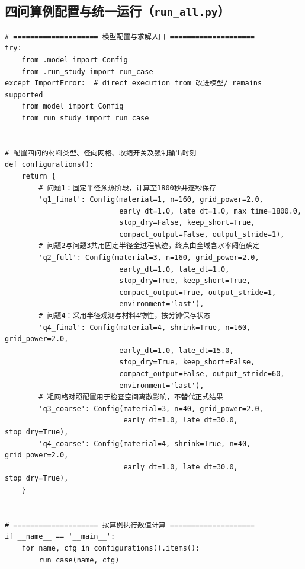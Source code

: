 \subsection{四问算例配置与统一运行（\texttt{run\_all.py}）}
\begin{Verbatim}[fontsize=\scriptsize,breaklines=true,breakanywhere=true]
# ==================== 模型配置与求解入口 ====================
try:
    from .model import Config
    from .run_study import run_case
except ImportError:  # direct execution from 改进模型/ remains supported
    from model import Config
    from run_study import run_case


# 配置四问的材料类型、径向网格、收缩开关及强制输出时刻
def configurations():
    return {
        # 问题1：固定半径预热阶段，计算至1800秒并逐秒保存
        'q1_final': Config(material=1, n=160, grid_power=2.0,
                           early_dt=1.0, late_dt=1.0, max_time=1800.0,
                           stop_dry=False, keep_short=True,
                           compact_output=False, output_stride=1),
        # 问题2与问题3共用固定半径全过程轨迹，终点由全域含水率阈值确定
        'q2_full': Config(material=3, n=160, grid_power=2.0,
                           early_dt=1.0, late_dt=1.0,
                           stop_dry=True, keep_short=True,
                           compact_output=True, output_stride=1,
                           environment='last'),
        # 问题4：采用半径观测与材料4物性，按分钟保存状态
        'q4_final': Config(material=4, shrink=True, n=160, grid_power=2.0,
                           early_dt=1.0, late_dt=15.0,
                           stop_dry=True, keep_short=False,
                           compact_output=False, output_stride=60,
                           environment='last'),
        # 粗网格对照配置用于检查空间离散影响，不替代正式结果
        'q3_coarse': Config(material=3, n=40, grid_power=2.0,
                            early_dt=1.0, late_dt=30.0, stop_dry=True),
        'q4_coarse': Config(material=4, shrink=True, n=40, grid_power=2.0,
                            early_dt=1.0, late_dt=30.0, stop_dry=True),
    }


# ==================== 按算例执行数值计算 ====================
if __name__ == '__main__':
    for name, cfg in configurations().items():
        run_case(name, cfg)
\end{Verbatim}

